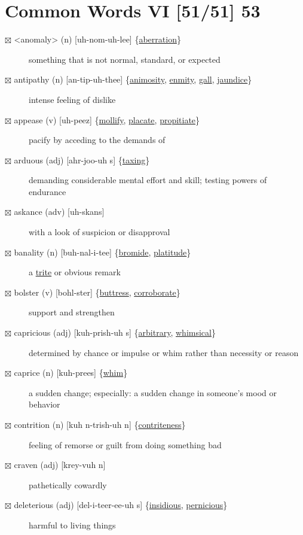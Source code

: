 \documentclass[11pt]{article}
\begin{document}
\section{Common Words VI [51/51] 53}
\label{sec:orgaa468ef}
\begin{description}
\item[{$\boxtimes$ <\label{orgdebccc3}anomaly> (n) [uh-nom-uh-lee] \{\hyperref[org7fb3d6a]{aberration}\}}] something that is not normal, standard, or expected
\item[{$\boxtimes$ \label{org53f5dc2}antipathy (n) [an-tip-uh-thee] \{\hyperref[orgcd922a6]{animosity}, \hyperref[org22b3817]{enmity}, \hyperref[orge1299c1]{gall}, \hyperref[orgfb883d9]{jaundice}\}}] intense feeling of dislike
\item[{$\boxtimes$ \label{orgd8f6dca}appease (v) [uh-peez] \{\hyperref[org3a878a4]{mollify}, \hyperref[orgdd5cad8]{placate}, \hyperref[org1023dff]{propitiate}\}}] pacify by acceding to the demands of
\item[{$\boxtimes$ \label{org544fb36}arduous (adj) [ahr-joo-uh s] \{\hyperref[org6476319]{taxing}\}}] demanding considerable mental effort and skill; testing powers of endurance
\item[{$\boxtimes$ askance (adv) [uh-skans]}] with a look of suspicion or disapproval
\item[{$\boxtimes$ \label{orga4de2d2}banality (n) [buh-nal-i-tee] \{\hyperref[org73365c5]{bromide}, \hyperref[org953e432]{platitude}\}}] a \hyperref[org91e02d4]{trite} or obvious remark
\item[{$\boxtimes$ \label{org28a9d71}bolster (v) [bohl-ster] \{\hyperref[org8c441c2]{buttress}, \hyperref[orgf7ed622]{corroborate}\}}] support and strengthen
\item[{$\boxtimes$ \label{orgef62d01}capricious (adj) [kuh-prish-uh s] \{\hyperref[org23782c5]{arbitrary}, \hyperref[org77ef95d]{whimsical}\}}] determined by chance or impulse or whim rather than necessity or reason
\item[{$\boxtimes$ caprice (n) [kuh-prees] \{\hyperref[org8101a2d]{whim}\}}] a sudden change; especially: a sudden change in someone's mood or behavior
\item[{$\boxtimes$ contrition (n) [kuh n-trish-uh n] \{\hyperref[org9637a24]{contriteness}\}}] feeling of remorse or guilt from doing something bad
\item[{$\boxtimes$ craven (adj) [krey-vuh n]}] pathetically cowardly
\item[{$\boxtimes$ \label{org91e2062}deleterious (adj) [del-i-teer-ee-uh s] \{\hyperref[orgdb9cb07]{insidious}, \hyperref[org5e79379]{pernicious}\}}] harmful to living things

\end{description}
\end{document}
